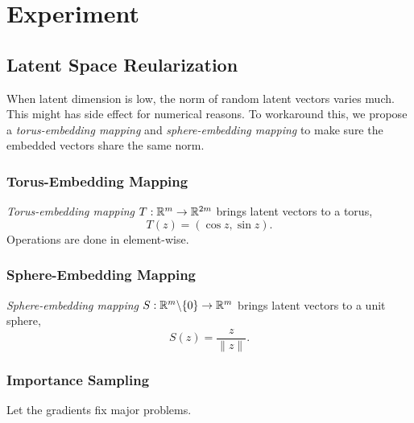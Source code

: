\section{Experiment}\label{sec:exp}

\subsection{Latent Space Reularization}

When latent dimension is low,
the norm of random latent vectors varies much.
This might has side effect for numerical reasons.
To workaround this,
we propose a \emph{torus-embedding mapping} and \emph{sphere-embedding mapping}
to make sure the embedded vectors share the same norm.

\subsubsection{Torus-Embedding Mapping}

\emph{Torus-embedding mapping} \(T:{\mathbb{R}}^m\to{\mathbb{R}}^{2m}\) brings latent vectors to a torus,
\begin{equation}
    T(z) = (\cos z, \sin z).
\end{equation}
Operations are done in element-wise.

\subsubsection{Sphere-Embedding Mapping}

\emph{Sphere-embedding mapping} \(S:{\mathbb{R}}^m\backslash\{0\}\to{\mathbb{R}}^{m}\) brings latent vectors to a unit sphere,
\begin{equation}
    S(z) = \frac{z}{\|z\|}.
\end{equation}

\subsubsection{Importance Sampling}

Let the gradients fix major problems.
